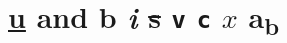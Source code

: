 \documentclass[11pt]{article}
\author{Au}
\date{2026-01-01}
\title{}
\begin{document}
\tableofcontents

\section{\underline{u} and \textbf{b} \emph{i} \sout{s} \texttt{v} \texttt{c} \(x\) a\textsubscript{b}}
\label{sec:org8f9d0ea}
\end{document}
